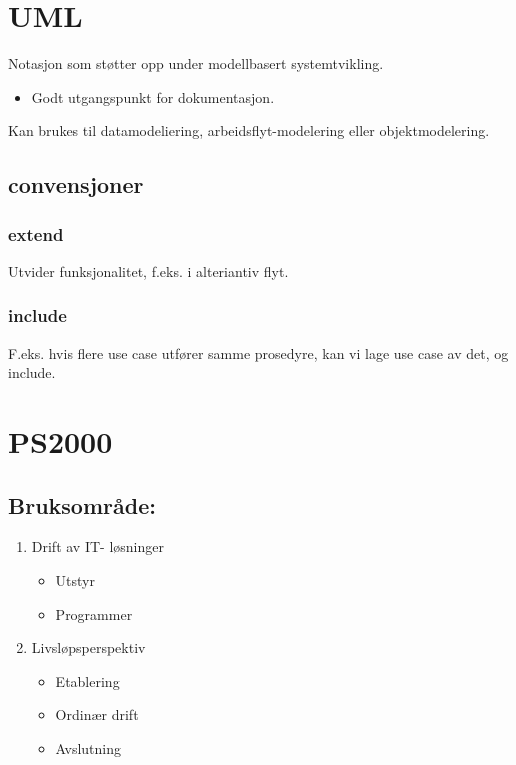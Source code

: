 \documentclass[11pt]{article}
\begin{document}
\section{UML}
\label{sec-11}

  Notasjon som støtter opp under modellbasert systemtvikling.
\begin{itemize}
\item Godt utgangspunkt for dokumentasjon.
\end{itemize}
  Kan brukes til datamodeliering, arbeidsflyt-modelering eller objektmodelering.
\subsection{convensjoner}
\label{sec-11.1}
\subsubsection{\label{extend}extend}
\label{sec-11.1.1}

    Utvider funksjonalitet, f.eks. i alteriantiv flyt.
\subsubsection{\label{include}include}
\label{sec-11.1.2}

    F.eks. hvis flere use case utfører samme prosedyre, kan vi lage use case av det, og include.
\section{PS2000}
\label{sec-12}
\subsection{Bruksområde:}
\label{sec-12.1}

\begin{enumerate}
\item Drift av IT- løsninger

\begin{itemize}
\item Utstyr
\item Programmer
\end{itemize}

\item Livsløpsperspektiv

\begin{itemize}
\item Etablering
\item Ordinær drift
\item Avslutning
\end{itemize}

\end{enumerate}
\end{document}
